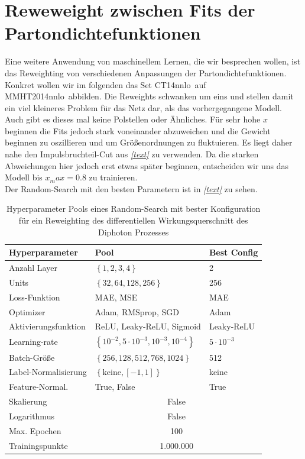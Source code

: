 \section{Reweweight zwischen Fits der Partondichtefunktionen}
Eine weitere Anwendung von maschinellem Lernen, die wir besprechen wollen, ist das Reweighting von verschiedenen Anpassungen der Partondichtefunktionen. Konkret wollen wir im folgenden das Set \glqq CT14nnlo\grqq~auf \glqq MMHT2014nnlo\grqq~abbilden. Die Reweights schwanken um eins und stellen damit ein viel kleineres Problem für das Netz dar, als das vorhergegangene Modell. Auch gibt es dieses mal keine Polstellen oder Ähnliches. Für sehr hohe $x$ beginnen die Fits jedoch stark voneinander abzuweichen und die Gewicht beginnen zu oszillieren und um Größenordnungen zu fluktuieren. Es liegt daher nahe den Impulsbruchteil-Cut aus \textit{\autoref{text}} zu verwenden. Da die starken Abweichungen hier jedoch erst etwas später beginnen, entscheiden wir uns das Modell bis $x_max=0.8$ zu trainieren. \\
Der Random-Search mit den besten Parametern ist in \textit{\autoref{text}} zu sehen.
\begin{table}
	\centering
	\begin{tabular}{|l|l|l|}
		\hline
		Hyperparameter & Pool & Best Config \\
		\hline
		Anzahl Layer & $\left\lbrace 1,2,3,4\right\rbrace$ & 2 \\
		Units &$\left\lbrace 32, 64, 128, 256\right\rbrace$ & 256 \\
		Loss-Funktion & MAE, MSE & MAE \\
		Optimizer & Adam, RMSprop, SGD  & Adam\\
		Aktivierungsfunktion & ReLU, Leaky-ReLU, Sigmoid & Leaky-ReLU \\
		Learning-rate & $\left\lbrace 10^{-2}, 5 \cdot 10^{-3}, 10^{-3}, 10^{-4} \right\rbrace $ & $5 \cdot 10^{-3}$\\
		Batch-Größe & $\left\lbrace 256, 128, 512, 768, 1024 \right\rbrace $ & 512\\
		Label-Normalisierung & $\left\lbrace \text{keine}, [-1,1]\right\rbrace $ & keine\\
		Feature-Normal. & True, False & True \\
		\hline
		Skalierung & \multicolumn{2}{c|}{False} \\
		Logarithmus & \multicolumn{2}{c|}{False} \\ 
		Max. Epochen & \multicolumn{2}{c|}{100}\\
		Trainingspunkte & \multicolumn{2}{c|}{1.000.000} \\
		\hline
	\end{tabular}
	\caption{Hyperparameter Pools eines Random-Search mit bester Konfiguration für ein Reweighting des differentiellen Wirkungsquerschnitt des Diphoton Prozesses}
\end{table}
